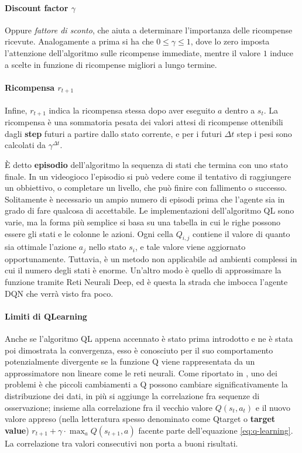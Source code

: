 \documentclass[twoside,twocolumn,10pt]{extarticle}
\theoremstyle{definition}
\begin{document}
		\paragraph*{Discount factor $\gamma$}\label{par:gamma} Oppure \textit{fattore di sconto}, che aiuta a determinare l'importanza delle ricompense ricevute. Analogamente a prima si ha che $0 \leq \gamma \leq 1$, dove lo zero imposta l'attenzione dell'algoritmo sulle ricompense immediate, mentre il valore $1$ induce a scelte in funzione di ricompense migliori a lungo termine.
		
		\paragraph*{Ricompensa $r_{t + 1}$}\label{par:reward} Infine, $r_{t + 1}$ indica la ricompensa stessa dopo aver eseguito $a$ dentro a $s_t$. La ricompensa è una sommatoria pesata dei valori attesi di ricompense ottenibili dagli \textbf{step} futuri a partire dallo stato corrente, e per i futuri $\Delta t$ step i pesi sono calcolati da $\gamma^{\Delta t}$.
		
		È detto \textbf{episodio} dell'algoritmo la sequenza di stati che termina con uno stato finale. In un videogioco l'episodio si può vedere come il tentativo di raggiungere un obbiettivo, o completare un livello, che può finire con fallimento o successo. Solitamente è necessario un ampio numero di episodi prima che l'agente sia in grado di fare qualcosa di accettabile. Le implementazioni dell'algoritmo QL sono varie, ma la forma più semplice si basa su una tabella in cui le righe possono essere gli stati e le colonne le azioni. Ogni cella $Q_{i, j}$ contiene il valore di quanto sia ottimale l'azione $a_j$ nello stato $s_i$, e tale valore viene aggiornato opportunamente. Tuttavia, è un metodo non applicabile ad ambienti complessi in cui il numero degli stati è enorme. Un'altro modo è quello di approssimare la funzione tramite Reti Neurali Deep, ed è questa la strada che imbocca l'agente DQN che verrà visto fra poco.
		
		\paragraph{Limiti di Q\texttwelveudash Learning} Anche se l'algoritmo QL appena accennato è stato prima introdotto e ne è stata poi dimostrata la convergenza, esso è conosciuto per il suo comportamento potenzialmente divergente se la funzione Q viene rappresentata da un approssimatore non lineare come le reti neurali. Come riportato in \cite{bib:dqn}, uno dei problemi è che piccoli cambiamenti a Q possono cambiare significativamente la distribuzione dei dati, in più si aggiunge la correlazione fra sequenze di osservazione; insieme alla correlazione fra il vecchio valore $Q(s_t, a_t)$ e il nuovo valore appreso (nella letteratura spesso denominato come Q\texttwelveudash target o \textbf{target value}) $r_{t + 1} + \gamma \cdot \max_a Q(s_{t + 1}, a)$ facente parte dell'equazione \ref{eq:q-learning}. La correlazione tra valori consecutivi non porta a buoni risultati.
		
\end{document}
